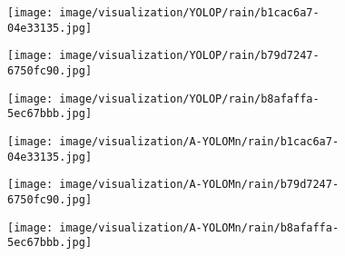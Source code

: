 \documentclass[lettersize,journal]{IEEEtran}
\begin{document}
{\begin{figure*}[!h]
    \begin{subfigure}[b]{0.05\textwidth}
            \centering
            \vspace{0.6cm} 
    \end{subfigure}\begin{subfigure}{0.25\textwidth}
        \centering
        \texttt{[image: image/visualization/YOLOP/rain/b1cac6a7-04e33135.jpg]}
    \end{subfigure}\hspace{0.5cm}
    \begin{subfigure}{0.25\textwidth}
        \centering
        \texttt{[image: image/visualization/YOLOP/rain/b79d7247-6750fc90.jpg]}
    \end{subfigure}\hspace{0.5cm}
    \begin{subfigure}{0.25\textwidth}
        \centering
        \texttt{[image: image/visualization/YOLOP/rain/b8afaffa-5ec67bbb.jpg]}
    \end{subfigure}
    
    \medskip
    \begin{subfigure}[b]{0.05\textwidth}
        \centering
        \vspace{0.2cm}
    \end{subfigure}\begin{subfigure}{0.25\textwidth}
        \centering
        \texttt{[image: image/visualization/A-YOLOMn/rain/b1cac6a7-04e33135.jpg]}
    \end{subfigure}\hspace{0.5cm}
    \begin{subfigure}{0.25\textwidth}
        \centering
        \texttt{[image: image/visualization/A-YOLOMn/rain/b79d7247-6750fc90.jpg]}
    \end{subfigure}\hspace{0.5cm}
    \begin{subfigure}{0.25\textwidth}
        \centering
        \texttt{[image: image/visualization/A-YOLOMn/rain/b8afaffa-5ec67bbb.jpg]}
    \end{subfigure}

    \medskip
    

\end{figure*}}
\end{document}

